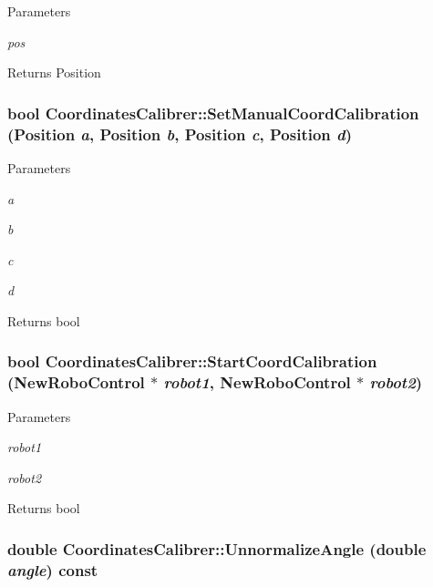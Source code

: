 \begin{DoxyParams}{Parameters}
\item[{\em pos}]\end{DoxyParams}
\begin{DoxyReturn}{Returns}
Position 
\end{DoxyReturn}
\hypertarget{classCoordinatesCalibrer_a006c18905b14e4780b9fc74fe26649fc}{
\subsubsection[{SetManualCoordCalibration}]{\setlength{\rightskip}{0pt plus 5cm}bool CoordinatesCalibrer::SetManualCoordCalibration (Position {\em a}, \/  Position {\em b}, \/  Position {\em c}, \/  Position {\em d})}}
\label{classCoordinatesCalibrer_a006c18905b14e4780b9fc74fe26649fc}

\begin{DoxyParams}{Parameters}
\item[{\em a}]\item[{\em b}]\item[{\em c}]\item[{\em d}]\end{DoxyParams}
\begin{DoxyReturn}{Returns}
bool 
\end{DoxyReturn}
\hypertarget{classCoordinatesCalibrer_a2087994adbb8651efcb06e3d7a2315da}{
\subsubsection[{StartCoordCalibration}]{\setlength{\rightskip}{0pt plus 5cm}bool CoordinatesCalibrer::StartCoordCalibration ({\bf NewRoboControl} $\ast$ {\em robot1}, \/  {\bf NewRoboControl} $\ast$ {\em robot2})}}
\label{classCoordinatesCalibrer_a2087994adbb8651efcb06e3d7a2315da}

\begin{DoxyParams}{Parameters}
\item[{\em robot1}]\item[{\em robot2}]\end{DoxyParams}
\begin{DoxyReturn}{Returns}
bool 
\end{DoxyReturn}
\hypertarget{classCoordinatesCalibrer_ab97fd4d3f3930aaff39cee1543022cb6}{
\subsubsection[{UnnormalizeAngle}]{\setlength{\rightskip}{0pt plus 5cm}double CoordinatesCalibrer::UnnormalizeAngle (double {\em angle}) const}}
\label{classCoordinatesCalibrer_ab97fd4d3f3930aaff39cee1543022cb6}

